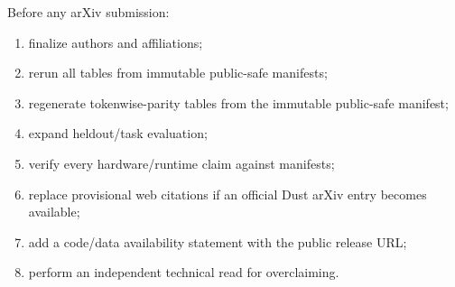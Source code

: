 \documentclass[11pt]{article}
\begin{document}
Before any arXiv submission:
\begin{enumerate}
    \item finalize authors and affiliations;
    \item rerun all tables from immutable public-safe manifests;
    \item regenerate tokenwise-parity tables from the immutable public-safe manifest;
    \item expand heldout/task evaluation;
    \item verify every hardware/runtime claim against manifests;
    \item replace provisional web citations if an official Dust arXiv entry
    becomes available;
    \item add a code/data availability statement with the public release URL;
    \item perform an independent technical read for overclaiming.
\end{enumerate}
\end{document}
